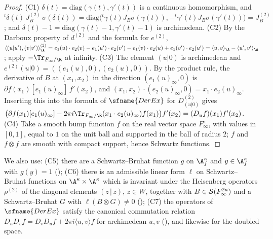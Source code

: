 \begin{proof}
(C1) $\delta(t)=\mathrm{diag}(\gamma(t),\gamma'(t))$ is a continuous homomorphism, and ${}^t\delta(t)\,J_B^{(2)}\,\sigma(\delta(t))
=\mathrm{diag}\bigl({}^t\gamma(t)J_B\sigma(\gamma(t)),-{}^t\gamma'(t)J_B\sigma(\gamma'(t))\bigr)=J_B^{(2)}$; and $\delta(t)-1=\mathrm{diag}(\gamma(t)-1,
\gamma'(t)-1)$ is archimedean. (C2) By the Darboux property of $d^{(2)}$ and the formula for $e^{(2)}$,
$\langle(u|u'),(v|v')\rangle^{(2)}_\A=e_1(u)\cdot e_2(v)-e_1(u')\cdot e_2(v')-e_1(v)\cdot e_2(u)+e_1(v')\cdot e_2(u')=\langle u,v\rangle_\A-\langle
u',v'\rangle_\A$; apply $-\Tr_{F_\infty/\R}$ at infinity. (C3) The element $(u|0)$ is archimedean and $e^{(2)}(u|0)=((e_1(u),0),(e_2(u),0))$.
By the product rule, the derivative of $B$ at $(x_1,x_2)$ in the direction $(e_1(u)_\infty,0)$ is $\partial f(x_1)[e_1(u)_\infty]\,f'(x_2)$,
and $(x_1,x_2)\cdot(e_2(u)_\infty,0)=x_1\cdot e_2(u)_\infty$. Inserting this into the formula of $\sfname{DerEx}$ for $D^{(2)}_{(u|0)}$ gives
$\bigl(\partial f(x_1)[e_1(u)_\infty]-2\pi i\Tr_{F_\infty/\R}(x_1\cdot e_2(u)_\infty)f(x_1)\bigr)f'(x_2)=(D_uf)(x_1)f'(x_2)$. (C4) Take a smooth
bump function $f$ on the real vector space $F_\infty^\kappa$, with values in $[0,1]$, equal to $1$ on the unit ball and supported in the
ball of radius $2$; $f$ and $f\otimes f$ are smooth with compact support, hence Schwartz functions.
\end{proof}

We also use: (C5) there are a Schwartz--Bruhat function $g$ on $\A_f^\kappa$ and $y\in\A_f^\kappa$ with $g(y)=1$
(); (C6) there is an admissible linear form $\ell$ on Schwartz--Bruhat
functions on $\A^{\kappa}\times\A^{\kappa}$ which is invariant under the Heisenberg operators $\rho^{(2)}$ of the diagonal elements
$(z\,|\,z)$, $z\in W$, together with $B\in\mathcal S(F_\infty^{2\kappa})$ and a Schwartz--Bruhat $G$ with $\ell(B\otimes G)\ne0$
(); (C7) the operators of $\sfname{DerEx}$ satisfy the canonical commutation
relation $D_uD_vf=D_vD_uf+2\pi i\langle u,v\rangle f$ for archimedean $u,v$ (), and likewise
for the doubled space.

